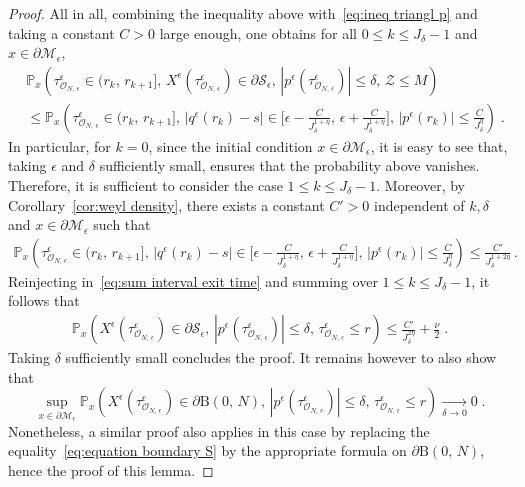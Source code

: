 \documentclass[10pt,a4paper]{amsart}
\newcommand{\M}{\mathcal{M}}
\begin{document}
\begin{proof}
All in all, combining the inequality above with~\eqref{eq:ineq triangl p} and taking a constant $C>0$ large enough, one obtains for all $0\leq k\leq J_\delta-1$ and $x\in\partial\M_\epsilon$,
\begin{align*}
&\mathbb{P}_{x}\left(\tau_{\mathcal{O}_{N,\,\epsilon}}^{\epsilon}\in(r_{k},\,r_{k+1}],\,X^{\epsilon}(\tau_{\mathcal{O}_{N,\,\epsilon}}^{\epsilon})\in\partial\mathcal{S}_{\epsilon},\,|p^{\epsilon}(\tau_{\mathcal{O}_{N,\,\epsilon}}^{\epsilon})|\leq\delta,\,\mathcal{Z}\leq M\right)\nonumber \\
 & \leq\mathbb{P}_{x}\left(\tau_{\mathcal{O}_{N,\,\epsilon}}^{\epsilon}\in(r_{k},\,r_{k+1}],\,\big|q^{\epsilon}(r_{k})-s\big|\in\big[\epsilon-\frac{C}{J_\delta^{1+\eta}},\,\epsilon+\frac{C}{J_\delta^{1+\eta}}\big],\,\big|p^{\epsilon}(r_{k})\big|\leq\frac{C}{J^{\eta}_\delta}\right)\;.
\end{align*}
In particular, for $k=0$, since the initial condition $x\in\partial\M_\epsilon$, it is easy to see that, taking $\epsilon$ and $\delta$ sufficiently small, ensures that the probability above vanishes. Therefore, it is sufficient to consider the case $1\leq k\leq J_\delta-1$. Moreover, by Corollary~\ref{cor:weyl density}, there exists a constant $C'>0$ independent of $k,\delta$ and $x\in\partial\M_\epsilon$ such that
\begin{align*}
\mathbb{P}_{x}\left(\tau_{\mathcal{O}_{N,\,\epsilon}}^{\epsilon}\in(r_{k},\,r_{k+1}],\,\big|q^{\epsilon}(r_{k})-s\big|\in\big[\epsilon-\frac{C}{J_\delta^{1+\eta}},\,\epsilon+\frac{C}{J_\delta^{1+\eta}}\big],\,\big|p^{\epsilon}(r_{k})\big|\leq\frac{C}{J^{\eta}_\delta}\right) 
 \leq \frac{C'}{J_\delta^{1+2\eta}}\,.
\end{align*}
Reinjecting in~\eqref{eq:sum interval exit time} and summing over $1\leq k\leq J_\delta-1$, it follows that
\begin{align}
 \mathbb{P}_{x}\left(X^{\epsilon}(\tau_{\mathcal{O}_{N,\,\epsilon}}^{\epsilon})\in\partial\mathcal{S}_{\epsilon},\,|p^{\epsilon}(\tau_{\mathcal{O}_{N,\,\epsilon}}^{\epsilon})|\leq\delta,\,\tau_{\mathcal{O}_{N,\,\epsilon}}^{\epsilon}\leq r\right)\nonumber \leq \frac{C'}{J_\delta^{2\eta}}+\frac{\nu}{2}\;.
\end{align}
Taking $\delta$ sufficiently small concludes the proof. It remains however to also show that 
\[
\sup_{x\in\partial\mathcal{M}_{\epsilon}}\mathbb{P}_{x}\left(X^{\epsilon}(\tau_{\mathcal{O}_{N,\,\epsilon}}^{\epsilon})\in\partial\mathrm{B}(0,\,N),\,|p^{\epsilon}(\tau_{\mathcal{O}_{N,\,\epsilon}}^{\epsilon})|\leq\delta,\,\tau_{\mathcal{O}_{N,\,\epsilon}}^{\epsilon}\leq r\right)\underset{\delta\rightarrow0}{\longrightarrow}0\;.
\]
Nonetheless, a similar proof also applies in this case by replacing the equality~\eqref{eq:equation boundary S} by the appropriate formula on $\partial\mathrm{B}(0,\,N)$, hence the proof of this lemma. 
\end{proof}
\end{document}

